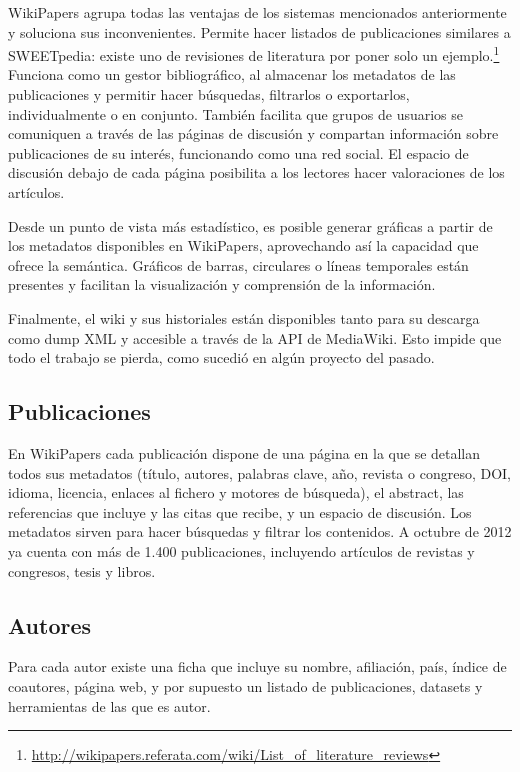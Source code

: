 \documentclass[11pt,twocolumn]{article}
\begin{document}
WikiPapers agrupa todas las ventajas de los sistemas mencionados anteriormente y soluciona sus inconvenientes. Permite hacer listados de publicaciones similares a SWEETpedia: existe uno de revisiones de literatura por poner solo un ejemplo.\footnote{\href{http://wikipapers.referata.com/wiki/List_of_literature_reviews}{http://wikipapers.referata.com/wiki/List\_of\_literature\_reviews}} Funciona como un gestor bibliográfico, al almacenar los metadatos de las publicaciones y permitir hacer búsquedas, filtrarlos o exportarlos, individualmente o en conjunto. También facilita que grupos de usuarios se comuniquen a través de las páginas de discusión y compartan información sobre publicaciones de su interés, funcionando como una red social. El espacio de discusión debajo de cada página posibilita a los lectores hacer valoraciones de los artículos.

Desde un punto de vista más estadístico, es posible generar gráficas a partir de los metadatos disponibles en WikiPapers, aprovechando así la capacidad que ofrece la semántica. Gráficos de barras, circulares o líneas temporales están presentes y facilitan la visualización y comprensión de la información.

Finalmente, el wiki y sus historiales están disponibles tanto para su descarga como dump XML y accesible a través de la API de MediaWiki. Esto impide que todo el trabajo se pierda, como sucedió en algún proyecto del pasado.

\subsection{Publicaciones}
En WikiPapers cada publicación dispone de una página en la que se detallan todos sus metadatos (título, autores, palabras clave, año, revista o congreso, DOI, idioma, licencia, enlaces al fichero y motores de búsqueda), el abstract, las referencias que incluye y las citas que recibe, y un espacio de discusión. Los metadatos sirven para hacer búsquedas y filtrar los contenidos. A octubre de 2012 ya cuenta con más de 1.400 publicaciones, incluyendo artículos de revistas y congresos, tesis y libros.

\subsection{Autores}
Para cada autor existe una ficha que incluye su nombre, afiliación, país, índice de coautores, página web, y por supuesto un listado de publicaciones, datasets y herramientas de las que es autor.
\end{document}
